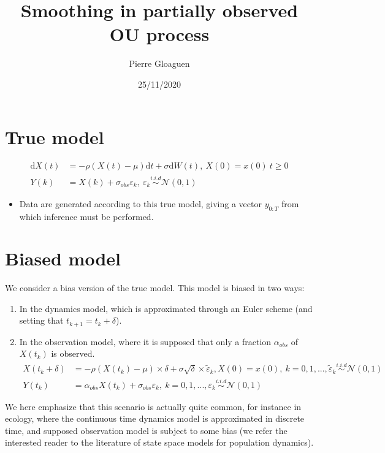 \documentclass[]{article}
\title{Smoothing in partially observed OU process}
\author{Pierre Gloaguen}
\date{25/11/2020}
\providecommand{\tightlist}{%
  \setlength{\itemsep}{0pt}\setlength{\parskip}{0pt}}
\begin{document}
\maketitle

\hypertarget{true-model}{%
\section{True model}\label{true-model}}

\begin{align}
\text{d} X(t) &= -\rho(X(t) - \mu) \text{d}t + \sigma \text{d}W(t),~X(0) = x(0)~t\geq 0\\
Y(k) &= X(k) + \sigma_{obs}\varepsilon_k,~ \varepsilon_k \overset{i.i.d}{\sim} \mathcal{N}(0, 1)
\end{align}

\begin{itemize}
\tightlist
\item
  Data are generated according to this true model, giving a vector
  \(y_{0:T}\) from which inference must be performed.
\end{itemize}

\hypertarget{biased-model}{%
\section{Biased model}\label{biased-model}}

We consider a bias version of the true model. This model is biased in
two ways:

\begin{enumerate}
\def\labelenumi{\arabic{enumi}.}
\tightlist
\item
  In the dynamics model, which is approximated through an Euler scheme
  (and setting that \(t_{k + 1} = t_k + \delta\)).
\item
  In the observation model, where it is supposed that only a fraction
  \(\alpha_{obs}\) of \(X(t_k)\) is observed. \begin{align}
  X(t_k + \delta) &= -\rho(X(t_k) - \mu)\times \delta + \sigma\sqrt{\delta} \times \tilde{\varepsilon}_k, X(0) = x(0), ~k =  0, 1,..., \tilde{\varepsilon}_k \overset{i.i.d}{\sim} \mathcal{N}(0, 1)\\
  Y(t_k) &= \alpha_{obs}X(t_k) + \sigma_{obs}\varepsilon_k,~k = 0, 1, ..., \varepsilon_k \overset{i.i.d}{\sim} \mathcal{N}(0, 1)
  \end{align}
\end{enumerate}

We here emphasize that this scenario is actually quite common, for
instance in ecology, where the continuous time dynamics model is
approximated in discrete time, and supposed observation model is subject
to some bias (we refer the interested reader to the literature of state
space models for population dynamics).
\end{document}
